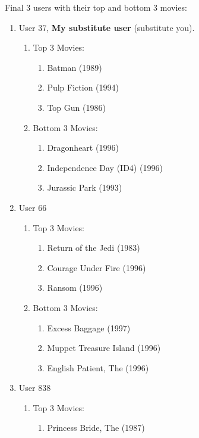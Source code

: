 \documentclass[12pt]{article}
\begin{document}
Final 3 users with their top and bottom 3 movies:
\begin{enumerate}
    \item User 37, \textbf{My substitute user} (substitute you).
    \begin{enumerate}
        \item Top 3 Movies:
        \begin{enumerate}
            \item Batman (1989)
            \item Pulp Fiction (1994)
            \item Top Gun (1986)
        \end{enumerate}
        \item Bottom 3 Movies:
        \begin{enumerate}
            \item Dragonheart (1996)
            \item Independence Day (ID4) (1996)
            \item Jurassic Park (1993)
        \end{enumerate}
    \end{enumerate}
    \item User 66
    \begin{enumerate}
        \item Top 3 Movies:
        \begin{enumerate}
            \item Return of the Jedi (1983)
            \item Courage Under Fire (1996)
            \item Ransom (1996)
        \end{enumerate}
        \item Bottom 3 Movies:
        \begin{enumerate}
            \item Excess Baggage (1997)
            \item Muppet Treasure Island (1996)
            \item English Patient, The (1996)
        \end{enumerate}
    \end{enumerate}
    \item User 838
    \begin{enumerate}
        \item Top 3 Movies:
        \begin{enumerate}
            \item Princess Bride, The (1987)

\end{enumerate}
\end{enumerate}
\end{enumerate}
\end{document}
